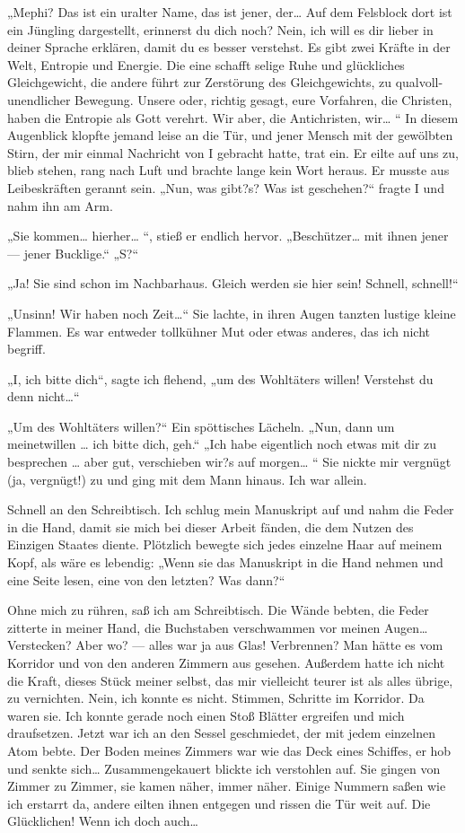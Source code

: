 „Mephi? Das ist ein uralter Name, das ist jener, der\ldots{} Auf dem
Felsblock dort ist ein Jüngling dargestellt, erinnerst du dich
noch? Nein, ich will es dir lieber in deiner Sprache erklären,
damit du es besser verstehst. Es gibt zwei Kräfte in der Welt,
Entropie und Energie. Die eine schafft selige Ruhe und glückliches
Gleichgewicht, die andere führt zur Zerstörung des Gleichgewichts,
zu qualvoll-unendlicher Bewegung. Unsere oder, richtig gesagt, eure
Vorfahren, die Christen, haben die Entropie als Gott verehrt. Wir
aber, die Antichristen, wir\ldots{} “ In diesem Augenblick klopfte
jemand leise an die Tür, und jener Mensch mit der gewölbten Stirn,
der mir einmal Nachricht von I gebracht hatte, trat ein. Er eilte
auf uns zu, blieb stehen, rang nach Luft und brachte lange kein
Wort heraus. Er musste aus Leibeskräften gerannt sein. „Nun, was
gibt?s? Was ist geschehen?“ fragte I und nahm ihn am Arm.

„Sie kommen\ldots{} hierher\ldots{} “, stieß er endlich hervor.
„Beschützer\ldots{} mit ihnen jener — jener Bucklige.“ „S?“

„Ja! Sie sind schon im Nachbarhaus. Gleich werden sie hier sein!
Schnell, schnell!“

„Unsinn! Wir haben noch Zeit\ldots{}“ Sie lachte, in ihren Augen tanzten
lustige kleine Flammen. Es war entweder tollkühner Mut oder etwas
anderes, das ich nicht begriff.

„I, ich bitte dich“, sagte ich flehend, „um des Wohltäters willen!
Verstehst du denn nicht\ldots{}“

„Um des Wohltäters willen?“ Ein spöttisches Lächeln. „Nun, dann um
meinetwillen \ldots{} ich bitte dich, geh.“ „Ich habe eigentlich noch
etwas mit dir zu besprechen \ldots{} aber gut, verschieben wir?s auf
morgen\ldots{} “ Sie nickte mir vergnügt (ja, vergnügt!) zu und ging mit
dem Mann hinaus. Ich war allein.

Schnell an den Schreibtisch. Ich schlug mein Manuskript auf und
nahm die Feder in die Hand, damit sie mich bei dieser Arbeit
fänden, die dem Nutzen des Einzigen Staates diente. Plötzlich
bewegte sich jedes einzelne Haar auf meinem Kopf, als wäre es
lebendig: „Wenn sie das Manuskript in die Hand nehmen und eine
Seite lesen, eine von den letzten? Was dann?“

Ohne mich zu rühren, saß ich am Schreibtisch. Die Wände bebten, die
Feder zitterte in meiner Hand, die Buchstaben verschwammen vor
meinen Augen\ldots{} Verstecken? Aber wo? — alles war ja aus Glas!
Verbrennen? Man hätte es vom Korridor und von den anderen Zimmern
aus gesehen. Außerdem hatte ich nicht die Kraft, dieses Stück
meiner selbst, das mir vielleicht teurer ist als alles übrige, zu
vernichten. Nein, ich konnte es nicht. Stimmen, Schritte im
Korridor. Da waren sie. Ich konnte gerade noch einen Stoß Blätter
ergreifen und mich draufsetzen. Jetzt war ich an den Sessel
geschmiedet, der mit jedem einzelnen Atom bebte. Der Boden meines
Zimmers war wie das Deck eines Schiffes, er hob und senkte sich\ldots{}
Zusammengekauert blickte ich verstohlen auf. Sie gingen von Zimmer
zu Zimmer, sie kamen näher, immer näher. Einige Nummern saßen wie
ich erstarrt da, andere eilten ihnen entgegen und rissen die Tür
weit auf. Die Glücklichen! Wenn ich doch auch\ldots{}

